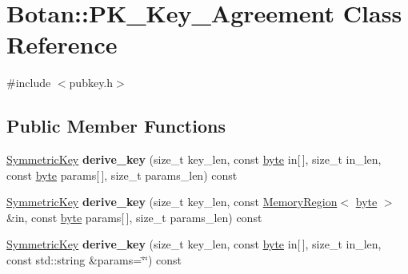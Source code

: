 \hypertarget{classBotan_1_1PK__Key__Agreement}{\section{Botan\-:\-:P\-K\-\_\-\-Key\-\_\-\-Agreement Class Reference}
\label{classBotan_1_1PK__Key__Agreement}
}


{\ttfamily \#include $<$pubkey.\-h$>$}

\subsection*{Public Member Functions}
\begin{DoxyCompactItemize}
\item 
\hypertarget{classBotan_1_1PK__Key__Agreement_a74ee54d2e7180928a96a9368fca889d2}{\hyperlink{namespaceBotan_a00c78597211d5c63b63e2a57ddb96d38}{Symmetric\-Key} {\bfseries derive\-\_\-key} (size\-\_\-t key\-\_\-len, const \hyperlink{namespaceBotan_a7d793989d801281df48c6b19616b8b84}{byte} in\mbox{[}$\,$\mbox{]}, size\-\_\-t in\-\_\-len, const \hyperlink{namespaceBotan_a7d793989d801281df48c6b19616b8b84}{byte} params\mbox{[}$\,$\mbox{]}, size\-\_\-t params\-\_\-len) const }\label{classBotan_1_1PK__Key__Agreement_a74ee54d2e7180928a96a9368fca889d2}

\item 
\hypertarget{classBotan_1_1PK__Key__Agreement_ae57905b9fdd7bb3bfe95bcdcaa303881}{\hyperlink{namespaceBotan_a00c78597211d5c63b63e2a57ddb96d38}{Symmetric\-Key} {\bfseries derive\-\_\-key} (size\-\_\-t key\-\_\-len, const \hyperlink{classBotan_1_1MemoryRegion}{Memory\-Region}$<$ \hyperlink{namespaceBotan_a7d793989d801281df48c6b19616b8b84}{byte} $>$ \&in, const \hyperlink{namespaceBotan_a7d793989d801281df48c6b19616b8b84}{byte} params\mbox{[}$\,$\mbox{]}, size\-\_\-t params\-\_\-len) const }\label{classBotan_1_1PK__Key__Agreement_ae57905b9fdd7bb3bfe95bcdcaa303881}

\item 
\hypertarget{classBotan_1_1PK__Key__Agreement_a8f532b4103913f27d50fa8e1ed05e07d}{\hyperlink{namespaceBotan_a00c78597211d5c63b63e2a57ddb96d38}{Symmetric\-Key} {\bfseries derive\-\_\-key} (size\-\_\-t key\-\_\-len, const \hyperlink{namespaceBotan_a7d793989d801281df48c6b19616b8b84}{byte} in\mbox{[}$\,$\mbox{]}, size\-\_\-t in\-\_\-len, const std\-::string \&params=\char`\"{}\char`\"{}) const }\label{classBotan_1_1PK__Key__Agreement_a8f532b4103913f27d50fa8e1ed05e07d}


\end{DoxyCompactItemize}
